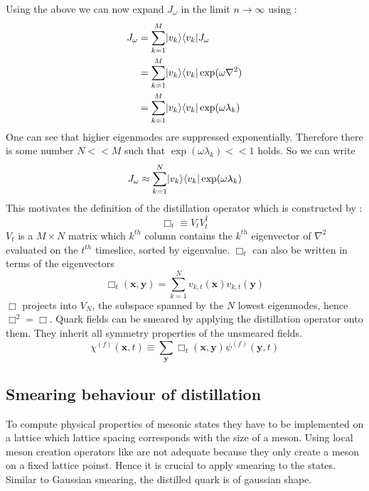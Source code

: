     Using the above we can now expand $J_\omega$ in the limit $n\rightarrow\infty$ using :
    \begin{equation}
        \begin{aligned}
            J_\omega &= \sum^M_{k=1}\lvert v_k\rangle\langle v_k\rvert J_\omega\\
            &= \sum^M_{k=1}\lvert v_k\rangle\langle v_k\rvert \exp(\omega\nabla^2)\\
            &= \sum^M_{k=1}\lvert v_k\rangle\langle v_k\rvert \exp(\omega\lambda_k)
        \end{aligned}
    \end{equation}
    One can see that higher eigenmodes are suppressed exponentially. Therefore there is some number $N<<M$ such that $\exp(\omega\lambda_k) << 1$ holds. So we can write
    \begin{equation}
        J_\omega \approx \sum^N_{k=1}\lvert v_k\rangle\langle v_k\rvert \exp(\omega\lambda_k)
    \end{equation}
    This motivates the definition of the distillation operator which is constructed by \cite{distillation_paper}:
    \begin{equation}
        \Box_t \equiv V_tV_t^\dagger
    \end{equation}
    $V_t$ is a $M \times N$ matrix which $k^{th}$ column contains the $k^{th}$ eigenvector of $\nabla^2$ evaluated on the $t^{th}$ timeslice, sorted by eigenvalue. $\Box_t$ can also be written in terms of the eigenvectors
    \begin{equation}\label{distillation_operator}
        \Box_{t}(\textbf{x},\textbf{y}) = \sum^N_{k=1}v_{k,t}(\textbf{x})v_{k,t}(\textbf{y})
    \end{equation}
    $\Box$ projects into $V_N$, the subspace spanned by the $N$ lowest eigenmodes, hence $\Box^2 = \Box$. Quark fields can be smeared by applying the distillation operator onto them. They inherit all symmetry properties of the unsmeared fields.
    \begin{equation}
        \chi^{(f)}(\textbf{x},t) \equiv \sum_{\textbf{y}} \Box_t(\textbf{x},\textbf{y}) \psi^{(f)}(\textbf{y},t)
    \end{equation}
    
\subsection{Smearing behaviour of distillation}
    To compute physical properties of mesonic states they have to be implemented on a lattice which lattice spacing corresponds with the size of a meson. Using local meson creation operators like  are not adequate because they only create a meson on a fixed lattice poinst. Hence it is crucial to apply smearing to the states. Similar to Gaussian smearing, the distilled quark is of gaussian shape.\\
    
